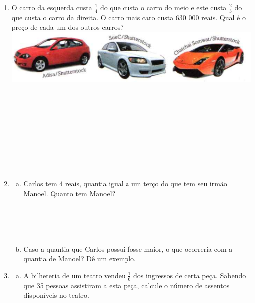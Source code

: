\documentclass[a4paper,14pt]{article}
\begin{document}
\begin{multicols}{2}
\begin{enumerate}
			\item O carro da esquerda custa $\frac{1}{4}$ do que custa o carro do meio e este custa $\frac{2}{3}$ do que custa o carro da direita. O carro mais caro custa 630 000 reais. Qual é o preço de cada um dos outros carros? \\ \includegraphics[width=1\linewidth]{6FMA08_imagens/imagem1} \\\\\\\\\\\\\\\\\\\\
			\item \begin{enumerate}[a)]
				\item Carlos tem 4 reais, quantia igual a um terço do que tem seu irmão Manoel. Quanto tem Manoel? \\\\\\\\\\
				\item Caso a quantia que Carlos possui fosse maior, o que ocorreria com a quantia de Manoel? Dê um exemplo. \\
			\end{enumerate}
			\item \begin{enumerate}[a)]
				\item A bilheteria de um teatro vendeu $\frac{1}{6}$ dos ingressos de certa peça. Sabendo que 35 pessoas assistiram a esta peça, calcule o número de assentos disponíveis no teatro. \\\\\\\\\\\\\\\\\\\\\\\\

\end{enumerate}
\end{enumerate}
\end{multicols}
\end{document}
